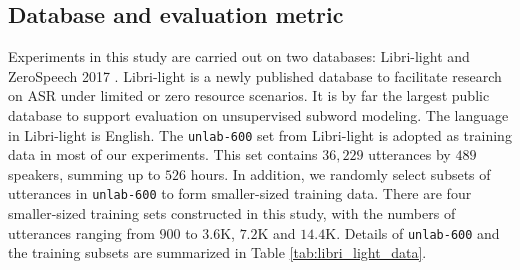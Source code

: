 \documentclass[a4paper]{article}
\begin{document}
\subsection{Database and evaluation metric}
Experiments in this study are carried out on two databases: Libri-light \cite{kahn2019librilight} and ZeroSpeech 2017 \cite{Dunbar2019}. Libri-light is a newly published   database to facilitate research on ASR under limited or zero resource scenarios. It is by far the largest public database to support evaluation on unsupervised subword modeling. The language in Libri-light is English. The \texttt{unlab-600} set from Libri-light is adopted as training data in most of our experiments. This set contains $36,229$ utterances by $489$ speakers, summing up to $526$ hours. In addition, we randomly select subsets of utterances in \texttt{unlab-600}  to form smaller-sized training data. There are four smaller-sized training sets constructed in this study, with the numbers of utterances ranging from $900$ to $3.6$K, $7.2$K and $14.4$K. Details of \texttt{unlab-600} and the training subsets are summarized in Table \ref{tab:libri_light_data}.
\begin{table}[htbp]
\renewcommand\arraystretch{0.90}
\centering
\caption{Libri-light training data and its subsets.}
\label{tab:libri_light_data}
\end{table}
\end{document}
